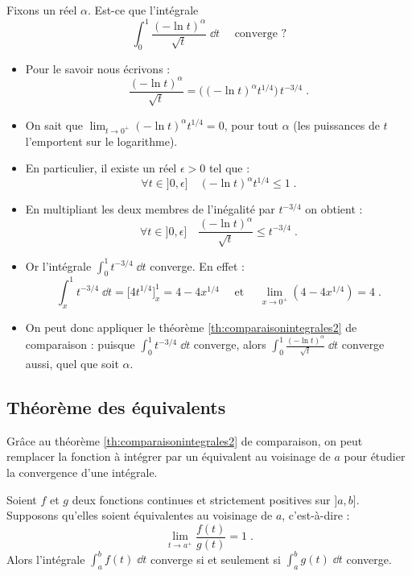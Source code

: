 \documentclass[class=report,crop=false]{standalone}
\begin{document}
\begin{exemple}
Fixons un réel $\alpha$. 
Est-ce que l'intégrale 
$$\int_0^1 \frac{(-\ln t)^\alpha}{\sqrt{t}}\;\dd t\quad\text{ converge ?}$$

\begin{itemize}
  \item Pour le savoir nous écrivons :
$$\frac{(-\ln t)^\alpha}{\sqrt{t}} = \big((-\ln t)^\alpha t^{1/4}\big)\,t^{-3/4}\;. $$
  
  \item On sait que $\lim_{t\rightarrow 0^+}  (-\ln t)^\alpha t^{1/4}=0$, 
  pour tout $\alpha$ (les puissances de $t$ l'emportent sur le logarithme). 
  
  \item En particulier, il existe un réel $\epsilon>0$ tel que :
$$\forall t\in]0,\epsilon]\quad (-\ln t)^\alpha t^{1/4}\le 1\;.$$ 
  
  \item En multipliant les deux membres de l'inégalité 
par $t^{-3/4}$ on obtient :
$$\forall t\in]0,\epsilon]\quad \frac{(-\ln t)^\alpha}{\sqrt{t}} \le t^{-3/4}\;.$$
  
  \item Or l'intégrale $\int_0^1 t^{-3/4}\;\dd t$ converge. En effet :
$$
\int_x^1 t^{-3/4}\;\dd t = \Big[4 t^{1/4}\Big]_x^1 = 
4-4x^{1/4}
\quad\text{ et }\quad
\lim_{x\rightarrow 0^+} (4-4x^{1/4}) =
4\;. 
$$

  \item On peut donc appliquer le théorème \ref{th:comparaisonintegrales2} de
comparaison : puisque $\int_0^1 t^{-3/4}\;\dd t$ converge, alors 
$\int_0^1 \frac{(-\ln t)^\alpha}{\sqrt{t}}\;\dd t$ converge aussi, quel que soit $\alpha$.  
\end{itemize}
\end{exemple}


\subsection{Théorème des équivalents}

Gr\^ace au théorème \ref{th:comparaisonintegrales2} de comparaison, 
on peut remplacer la fonction à intégrer par un équivalent au voisinage de $a$ pour
étudier la convergence d'une intégrale.

\begin{theoreme}
\label{th:equivalentintegrales2}
Soient $f$ et $g$ deux fonctions continues et strictement positives sur
$]a,b]$. 
Supposons qu'elles soient équivalentes au voisinage de $a$, c'est-à-dire :
$$\lim_{t\rightarrow a^+}\frac{f(t)}{g(t)} = 1\;.$$
Alors l'intégrale $\int_a^b f(t)\;\dd t$ converge si et seulement si 
$\int_a^b g(t)\;\dd t$ converge.
\end{theoreme}
\end{document}
